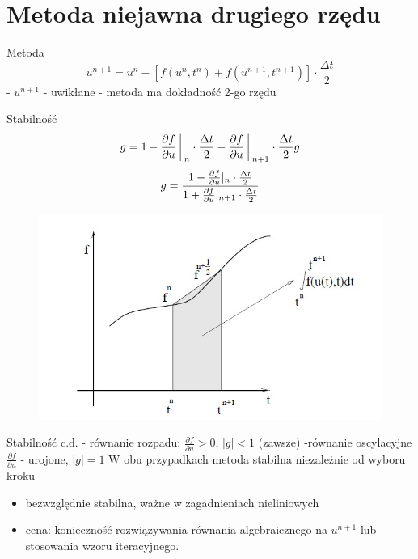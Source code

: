 \section{Metoda niejawna drugiego rzędu}
\begin{frame}{Metoda}
	$$u^{n+1} = u^n - [f(u^n,t^n)+f(u^{n+1},t^{n+1})]\cdot \frac{\Delta t}{2}$$
    \newline
    - $u^{n+1}$ - uwikłane
    \newline
    - metoda ma dokładność 2-go rzędu
\end{frame}
\begin{frame}{Stabilność}
	$$g = 1-\frac{\partial f}{\partial u}\bigg\arrowvert_n \cdot\frac{\Delta t}{2}-\frac{\partial f}{\partial u}\bigg\arrowvert_{n+1}\cdot \frac{\Delta t}{2} g$$
	$$g=\frac{1-\frac{\partial f}{\partial u}\arrowvert_n \cdot \frac{\Delta t}{2}}{1+\frac{\partial f}{\partial u}\arrowvert_{n+1} \cdot \frac{\Delta t}{2}}$$
    \begin{figure}
    	\includegraphics[height=0.55\textheight]{img/22/stabilnosc.jpg}
    \end{figure}
\end{frame}
\begin{frame}{Stabilność c.d.}
	- równanie rozpadu: $\frac{\partial f}{\partial u} > 0$, \quad $|g| < 1$ (zawsze)
    \newline
    -równanie oscylacyjne $\frac{\partial f}{\partial u}$ - urojone, $|g| = 1$
    \newline\newline
    W obu przypadkach metoda stabilna niezależnie od wyboru kroku
    \begin{itemize}
      \item bezwzględnie stabilna, ważne w zagadnieniach nieliniowych
      \item cena: konieczność rozwiązywania równania algebraicznego na $u^{n+1}$ lub stosowania wzoru iteracyjnego.
    \end{itemize}
\end{frame}
